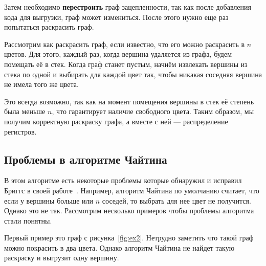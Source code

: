 Затем необходимо \textbf{перестроить} граф зацепленности, так как после добавления кода для выгрузки, граф может измениться. После этого нужно
еще раз попытаться раскрасить граф.

Рассмотрим как раскрасить граф, если известно, что его можно раскрасить в $n$ цветов. Для этого, каждый раз, когда вершина
удаляется из графа, будем помещать её в стек. Когда граф станет пустым, начнём извлекать вершины из стека по одной и выбирать
для каждой цвет так, чтобы никакая соседняя вершина не имела того же цвета. 

Это всегда возможно, так как на момент помещения вершины в стек её степень была меньше $n$, что гарантирует наличие свободного
цвета. Таким образом, мы получим корректную раскраску графа, а вместе с ней — распределение регистров.

\subsection{Проблемы в алгоритме Чайтина}

В этом алгоритме есть некоторые проблемы которые обнаружил и исправил Бриггс в своей работе~\cite{briggs1994}.
Например, алгоритм Чайтина по умолчанию считает, что если у вершины больше или $n$ соседей,
то выбрать для нее цвет не получится.
Однако это не так. 
Рассмотрим несколько примеров чтобы проблемы алгоритма стали понятны.

Первый пример это граф с рисунка~\ref{fig:ex2}. Нетрудно заметить что такой граф можно покрасить в два цвета.
Однако алгоритм Чайтина не найдет такую раскраску и выгрузит одну вершину.

\begin{figure}[H]
    \centering
\end{figure} %

